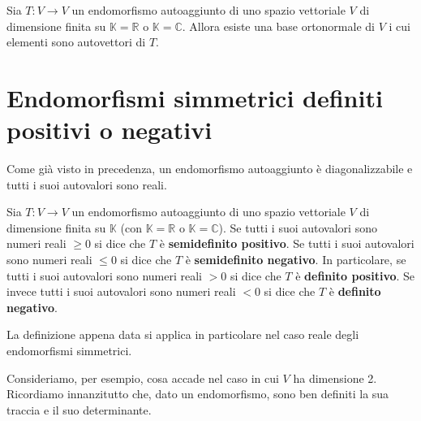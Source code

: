 \begin{theorem}
	Sia $T : V  \to V$ un endomorfismo autoaggiunto di uno spazio vettoriale $V$ di
	dimensione finita su $\mathbb{K} = \mathbb{R}$ o $\mathbb{K} = \mathbb{C}$.
	Allora esiste una base ortonormale di $V$ i cui elementi sono autovettori di $T$.
\end{theorem}


\section{Endomorfismi simmetrici definiti positivi o negativi}
Come gi\`a visto in precedenza, un endomorfismo autoaggiunto \`e diagonalizzabile e
tutti i suoi autovalori sono reali.

\begin{defn}
	Sia $T : V \to V$ un endomorfismo autoaggiunto di uno spazio vettoriale $V$ di
	dimensione finita su $\mathbb{K}$ (con $\mathbb{K} = \mathbb{R}$ o
	$\mathbb{K} = \mathbb{C}$). Se tutti i suoi autovalori sono numeri reali $\geq 0$
	si dice che $T$ \`e \textbf{semidefinito positivo}. Se tutti i suoi autovalori
	sono numeri reali $\leq 0$ si dice che $T$ \`e \textbf{semidefinito negativo}.
	In particolare, se tutti i suoi autovalori sono numeri reali $> 0$ si dice che
	$T$ \`e \textbf{definito positivo}. Se invece tutti i suoi autovalori sono numeri
	reali $< 0$ si dice che $T$ \`e \textbf{definito negativo}.
\end{defn}

La definizione appena data si applica in particolare nel caso reale degli
endomorfismi simmetrici.

Consideriamo, per esempio, cosa accade nel caso in cui $V$ ha dimensione 2.
Ricordiamo innanzitutto che, dato un endomorfismo, sono ben definiti la sua traccia
e il suo determinante.

